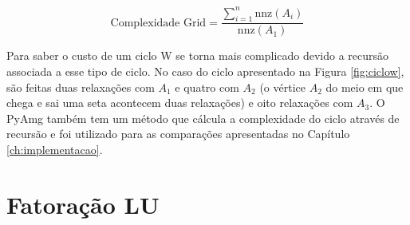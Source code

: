 \begin{equation}\label{eq:complexidadegrid}
    \text{Complexidade Grid} = \frac{\sum_{i=1}^n \text{nnz}(A_i)}{\text{nnz}(A_1)}
\end{equation}

Para saber o custo de um ciclo W se torna mais complicado devido a recursão associada a esse tipo de ciclo. No caso do ciclo apresentado na Figura \ref{fig:ciclow}, são feitas duas relaxações com $A_1$ e quatro com $A_2$ (o vértice $A_2$ do meio em que chega e sai uma seta acontecem duas relaxações) e oito relaxações com $A_3$. O PyAmg também tem um método que cálcula a complexidade do ciclo através de recursão e foi utilizado para as comparações apresentadas no Capítulo \ref{ch:implementacao}. 







\section{Fatoração LU} \label{sec:fatoracaolu}

